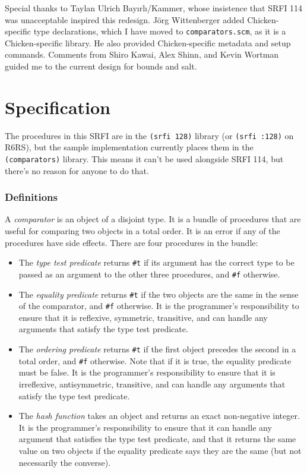 Special thanks to Taylan Ulrich Bayırlı/Kammer, whose insistence that
SRFI 114 was unacceptable inspired this redesign. Jörg Wittenberger
added Chicken-specific type declarations, which I have moved to
\texttt{comparators.scm}, as it is a Chicken-specific library. He also
provided Chicken-specific metadata and setup commands. Comments from
Shiro Kawai, Alex Shinn, and Kevin Wortman guided me to the current
design for bounds and salt.

\section{Specification}\label{specification}

The procedures in this SRFI are in the \texttt{(srfi\ 128)} library (or
\texttt{(srfi\ :128)} on R6RS), but the sample implementation currently
places them in the \texttt{(comparators)} library. This means it can't
be used alongside SRFI 114, but there's no reason for anyone to do that.

\subsubsection{Definitions}\label{definitions}

A \emph{comparator} is an object of a disjoint type. It is a bundle of
procedures that are useful for comparing two objects in a total order.
It is an error if any of the procedures have side effects. There are
four procedures in the bundle:

\begin{itemize}
\item
  The \emph{type test predicate} returns \texttt{\#t} if its argument
  has the correct type to be passed as an argument to the other three
  procedures, and \texttt{\#f} otherwise.
\item
  The \emph{equality predicate} returns \texttt{\#t} if the two objects
  are the same in the sense of the comparator, and \texttt{\#f}
  otherwise. It is the programmer's responsibility to ensure that it is
  reflexive, symmetric, transitive, and can handle any arguments that
  satisfy the type test predicate.
\item
  The \emph{ordering predicate} returns \texttt{\#t} if the first object
  precedes the second in a total order, and \texttt{\#f} otherwise. Note
  that if it is true, the equality predicate must be false. It is the
  programmer's responsibility to ensure that it is irreflexive,
  antisymmetric, transitive, and can handle any arguments that satisfy
  the type test predicate.
\item
  The \emph{hash function} takes an object and returns an exact
  non-negative integer. It is the programmer's responsibility to ensure
  that it can handle any argument that satisfies the type test
  predicate, and that it returns the same value on two objects if the
  equality predicate says they are the same (but not necessarily the
  converse).
\end{itemize}

